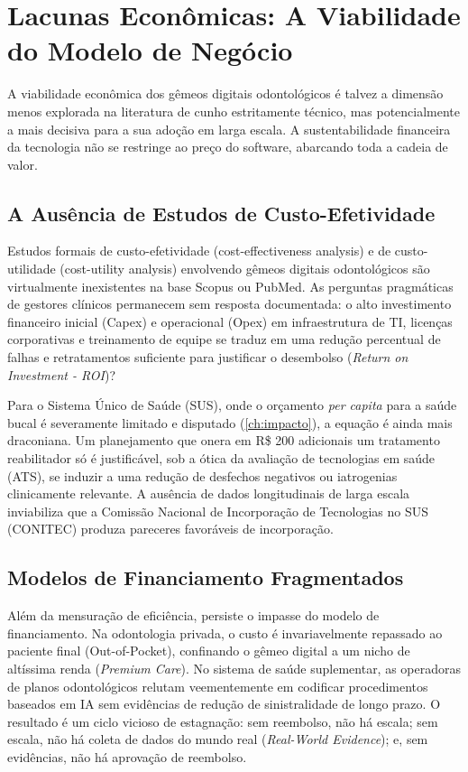 \section{Lacunas Econômicas: A Viabilidade do Modelo de Negócio}

A viabilidade econômica dos gêmeos digitais odontológicos é talvez a dimensão menos explorada na literatura de cunho estritamente técnico, mas potencialmente a mais decisiva para a sua adoção em larga escala. A sustentabilidade financeira da tecnologia não se restringe ao preço do software, abarcando toda a cadeia de valor.

\subsection{A Ausência de Estudos de Custo-Efetividade}

Estudos formais de custo-efetividade (cost-effectiveness analysis) e de custo-utilidade (cost-utility analysis) envolvendo gêmeos digitais odontológicos são virtualmente inexistentes na base Scopus ou PubMed. As perguntas pragmáticas de gestores clínicos permanecem sem resposta documentada: o alto investimento financeiro inicial (Capex) e operacional (Opex) em infraestrutura de TI, licenças corporativas e treinamento de equipe se traduz em uma redução percentual de falhas e retratamentos suficiente para justificar o desembolso (\textit{Return on Investment - ROI})?

Para o Sistema Único de Saúde (SUS), onde o orçamento \textit{per capita} para a saúde bucal é severamente limitado e disputado (\autoref{ch:impacto}), a equação é ainda mais draconiana. Um planejamento que onera em R\$ 200 adicionais um tratamento reabilitador só é justificável, sob a ótica da avaliação de tecnologias em saúde (ATS), se induzir a uma redução de desfechos negativos ou iatrogenias clinicamente relevante. A ausência de dados longitudinais de larga escala inviabiliza que a Comissão Nacional de Incorporação de Tecnologias no SUS (CONITEC) produza pareceres favoráveis de incorporação.

\subsection{Modelos de Financiamento Fragmentados}

Além da mensuração de eficiência, persiste o impasse do modelo de financiamento. Na odontologia privada, o custo é invariavelmente repassado ao paciente final (Out-of-Pocket), confinando o gêmeo digital a um nicho de altíssima renda (\textit{Premium Care}). No sistema de saúde suplementar, as operadoras de planos odontológicos relutam veementemente em codificar procedimentos baseados em IA sem evidências de redução de sinistralidade de longo prazo. O resultado é um ciclo vicioso de estagnação: sem reembolso, não há escala; sem escala, não há coleta de dados do mundo real (\textit{Real-World Evidence}); e, sem evidências, não há aprovação de reembolso.
